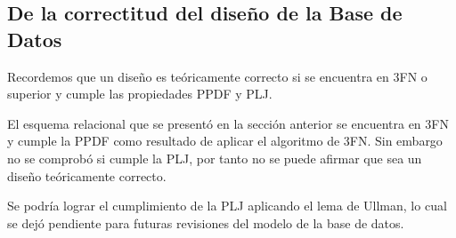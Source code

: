 \documentclass{article}
\begin{document}
\subsection{De la correctitud del diseño de la Base de Datos}
Recordemos que un diseño es teóricamente correcto si se encuentra en 3FN o superior y cumple las propiedades PPDF y PLJ.

El esquema relacional que se presentó en la sección anterior se encuentra en 3FN y cumple la PPDF como resultado de aplicar el algoritmo
de 3FN. Sin embargo no se comprobó si cumple la PLJ, por tanto no se puede afirmar que sea un diseño teóricamente correcto.

Se podría lograr el cumplimiento de la PLJ aplicando el lema de Ullman, lo cual se dejó pendiente para futuras revisiones del modelo de la
base de datos.

\newpage
\listoffigures
\end{document}
